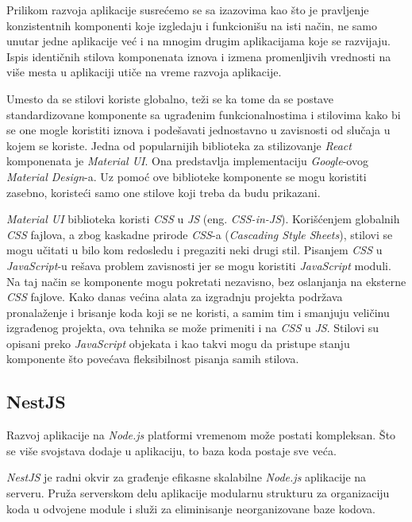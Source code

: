 Prilikom razvoja aplikacije susrećemo se sa izazovima kao što je pravljenje konzistentnih komponenti koje izgledaju i funkcionišu 
na isti način, ne samo unutar jedne aplikacije već i na mnogim drugim aplikacijama koje se razvijaju. Ispis identičnih stilova 
komponenata iznova i izmena promenljivih vrednosti na više mesta u aplikaciji utiče na vreme razvoja aplikacije.

Umesto da se stilovi koriste globalno, teži se ka tome da se postave standardizovane komponente sa ugrađenim funkcionalnostima i 
stilovima kako bi se one mogle koristiti iznova i podešavati jednostavno u zavisnosti od slučaja u kojem se koriste.
Jedna od popularnijih biblioteka za stilizovanje \textit{React} komponenata je \textit{Material UI}. Ona predstavlja 
implementaciju \textit{Google}-ovog \textit{Material Design}-a. Uz pomoć ove biblioteke komponente se mogu koristiti zasebno, 
koristeći samo one stilove koji treba da budu prikazani.

\textit{Material UI} biblioteka koristi \textit{CSS} u \textit{JS} (eng. \textit{CSS-in-JS}). Korišćenjem globalnih \textit{CSS} 
fajlova, a zbog kaskadne prirode \textit{CSS}-a (\textit{Cascading Style Sheets}), stilovi se mogu učitati u bilo kom redosledu 
i pregaziti neki drugi stil. Pisanjem \textit{CSS} u \textit{JavaScript}-u rešava problem zavisnosti jer se mogu koristiti 
\textit{JavaScript} moduli. Na taj način se komponente mogu pokretati nezavisno, bez oslanjanja na eksterne \textit{CSS} fajlove. 
Kako danas većina alata za izgradnju projekta podržava pronalaženje i brisanje koda koji se ne koristi, a samim tim i smanjuju 
veličinu izgrađenog projekta, ova tehnika se može primeniti i na \textit{CSS} u \textit{JS}. Stilovi su opisani preko 
\textit{JavaScript} objekata i kao takvi mogu da pristupe stanju komponente što povećava fleksibilnost pisanja samih stilova.


\subsection{NestJS}\label{sec:nestjs}
Razvoj aplikacije na \textit{Node.js} platformi vremenom može postati kompleksan. Što se više svojstava 
dodaje u aplikaciju, to baza koda postaje sve veća.

\textit{NestJS} je radni okvir za građenje efikasne skalabilne \textit{Node.js} aplikacije na serveru. 
Pruža serverskom delu aplikacije modularnu strukturu za organizaciju koda u odvojene module i služi 
za eliminisanje neorganizovane baze kodova.

